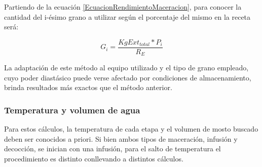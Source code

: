 \begin{itemize}
                    \par Partiendo de la ecuación \ref{EcuacionRendimientoMaceracion}, para conocer la cantidad del i-ésimo grano a utilizar según el porcentaje del mismo en la receta será:
                    
                    \begin{equation}
                        G_{i} = \frac{KgExt_{total} * P_{i}}{R_E}
                        \label{EcuacionCantidadGranoEmpirico}
                    \end{equation}
                    
                    \par La adaptación de este método al equipo utilizado y el tipo de grano empleado, cuyo poder diastásico puede verse afectado por condiciones de almacenamiento, brinda resultados más exactos que el método anterior.
                \end{itemize}
                
            \subsubsection{Temperatura y volumen de agua}
            \par Para estos cálculos, la temperatura de cada etapa y el volumen de mosto buscado deben ser conocidos a priori. Si bien ambos tipos de maceración, infusión y decocción, se inician con una infusión, para el salto de temperatura el procedimiento es distinto conllevando a distintos cálculos.
            
